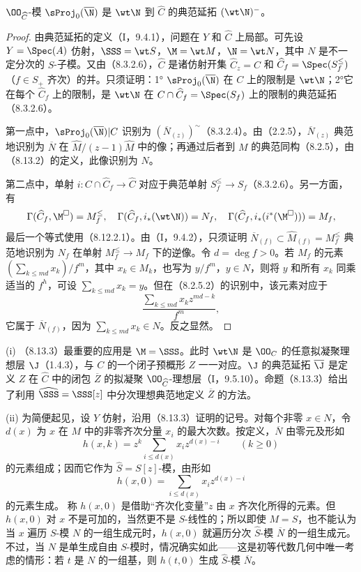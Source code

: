  $\OO_{\widehat C}$-模 $\sProj_0(\overline\N)$ 是 $\wt\N$ 到 $\widehat C$ 的典范延拓 $(\wt\N)^-$。
\begin{proof}
由典范延拓的定义（I，9.4.1），问题在 $Y$ 和 $\widehat C$ 上局部。可先设 $Y=\Spec(A)$ 仿射，$\SSS=\wt S$，$\M=\wt M$，$\N=\wt N$，其中 $N$ 是不一定分次的 $S$-子模。又由（8.3.2.6），$\widehat C$ 是诸仿射开集 $\widehat C_z=C$ 和 $\widehat C_f=\Spec(S_f^{\leq})$（$f\in S_+$ 齐次）的并。只须证明：1° $\sProj_0(\overline\N)$ 在 $C$ 上的限制是 $\wt\N$；2°它在每个 $\widehat C_f$ 上的限制，是 $\wt\N$ 在 $C\cap\widehat C_f=\Spec(S_f)$ 上的限制的典范延拓（8.3.2.6）。

第一点中，$\sProj_0(\overline\N)|C$ 识别为 $(\overline N_{(z)})^{\sim}$（8.3.2.4）。由（2.2.5），$\overline N_{(z)}$ 典范地识别为 $\overline N$ 在 $\widehat M/(z-1)\widehat M$ 中的像；再通过后者到 $M$ 的典范同构（8.2.5），由（8.13.2）的定义，此像识别为 $N$。

第二点中，单射 $i:C\cap\widehat C_f\to\widehat C$ 对应于典范单射 $S_f^{\leq}\to S_f$（8.3.2.6）。另一方面，有
\[\Gamma(\widehat C_f,\M^\square)=M_f^{\leq},\quad
\Gamma(\widehat C_f,i_*(\wt\N))=N_f,\quad
\Gamma(\widehat C_f,i_*(i^*(\M^\square)))=M_f,\]
最后一个等式使用（8.12.2.1）。由（I，9.4.2），只须证明 $\overline N_{(f)}\subset\widehat M_{(f)}=M_f^{\leq}$ 典范地识别为 $N_f$ 在单射 $M_f^{\leq}\to M_f$ 下的逆像。令 $d=\deg f>0$。若 $M_f$ 的元素 $(\sum_{k\leq md}x_k)/f^m$，其中 $x_k\in M_k$，也写为 $y/f^m$，$y\in N$，则将 $y$ 和所有 $x_k$ 同乘适当的 $f^h$，可设 $\sum_{k\leq md}x_k=y$。但在（8.2.5.2）的识别中，该元素对应于
\[\frac{\sum_{k\leq md}x_k z^{md-k}}{f^m},\]
它属于 $\overline N_{(f)}$，因为 $\sum_{k\leq md}x_k\in N$。反之显然。
\end{proof}

 (i) （8.13.3）最重要的应用是 $\M=\SSS$。此时 $\wt\N$ 是 $\OO_C$ 的任意拟凝聚理想层 $\J$（1.4.3），与 $C$ 的一个闭子预概形 $Z$ 一一对应。$\J$ 的典范延拓 $\overline\J$ 是定义 $Z$ 在 $\widehat C$ 中的闭包 $\overline Z$ 的拟凝聚 $\OO_{\widehat C}$-理想层（I，9.5.10）。命题（8.13.3）给出了利用 $\widehat\SSS=\SSS[z]$ 中分次理想典范地定义 $\overline Z$ 的方法。

(ii) 为简便起见，设 $Y$ 仿射，沿用（8.13.3）证明的记号。对每个非零 $x\in N$，令 $d(x)$ 为 $x$ 在 $M$ 中的非零齐次分量 $x_i$ 的最大次数。按定义，$\overline N$ 由零元及形如
\[h(x,k)=z^k\sum_{i\leq d(x)}x_i z^{d(x)-i}\qquad(k\geq0)\]
的元素组成；因而它作为 $\widehat S=S[z]$-模，由形如
\[h(x,0)=\sum_{i\leq d(x)}x_i z^{d(x)-i}\]
的元素生成。
称 $h(x,0)$ 是借助“齐次化变量”$z$ 由 $x$ 齐次化所得的元素。但 $h(x,0)$ 对 $x$ 不是可加的，当然更不是 $S$-线性的；所以即使 $M=S$，也不能认为当 $x$ 遍历 $S$-模 $N$ 的一组生成元时，$h(x,0)$ 就遍历分次 $\widehat S$-模 $\overline N$ 的一组生成元。不过，当 $N$ 是单生成自由 $S$-模时，情况确实如此——这是初等代数几何中唯一考虑的情形：若 $t$ 是 $N$ 的一组基，则 $h(t,0)$ 生成 $\widehat S$-模 $\overline N$。

